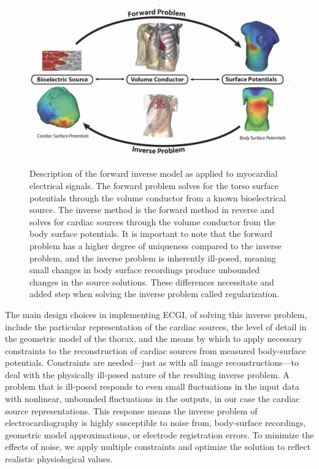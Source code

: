 \begin{figure}[htb]%
	\begin{center}
		{\includegraphics[width=\textwidth]
			{../Figures/ForwardInverseProbs.png}}
		\captionsetup{width = \textwidth}
		\caption{\small \label{fig:forwardInverse} Description of the forward inverse model as applied to myocardial electrical signals. The forward problem solves for the torso surface potentials through the volume conductor from a known bioelectrical source. The inverse method is the forward method in reverse and solves for cardiac sources through the volume conductor from the body surface potentials. It is important to note that the forward problem has a higher degree of uniqueness compared to the inverse problem, and the inverse problem is inherently ill-posed, meaning small changes in body surface recordings produce unbounded changes in the source solutions. These differences necessitate and added step when solving the inverse problem called regularization. }
	\end{center}
\end{figure}

The main design choices in implementing ECGI, \ie{} of solving this inverse
problem, include the particular representation of the cardiac sources, the
level of detail in the geometric model of the thorax, and the means by
which to apply necessary constraints to the reconstruction of cardiac
sources from measured body-surface potentials.  Constraints are
needed---just as with all image reconstructions---to deal with the
physically ill-posed nature of the resulting inverse problem. A problem
that is ill-posed responds to even small fluctuations in the input data
with nonlinear, unbounded fluctuations in the outputs, in our case the
cardiac source representations. This response means the inverse problem of
electrocardiography is highly susceptible to noise from, \eg{} body-surface
recordings, geometric model approximations, or electrode registration
errors. To minimize the effects of noise, we apply multiple constraints and
optimize the solution to reflect realistic physiological values.

